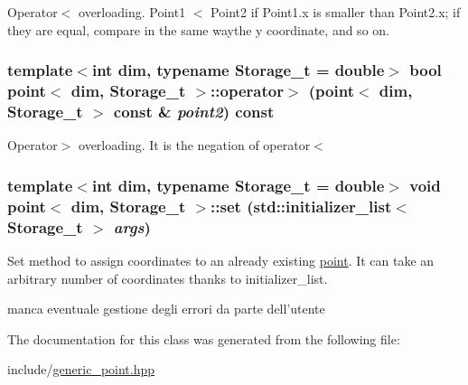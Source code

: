 Operator$<$ overloading. Point1 $<$ Point2 if Point1.x is smaller than Point2.x; if they are equal, compare in the same waythe y coordinate, and so on. \hypertarget{classpoint_a8baf3445a84302a9f290ff6c71648ced}{
\subsubsection[{operator$>$}]{\setlength{\rightskip}{0pt plus 5cm}template$<$int dim, typename Storage\_\-t = double$>$ bool {\bf point}$<$ dim, Storage\_\-t $>$::operator$>$ ({\bf point}$<$ dim, Storage\_\-t $>$ const \& {\em point2}) const}}
\label{classpoint_a8baf3445a84302a9f290ff6c71648ced}


Operator$>$ overloading. It is the negation of operator$<$ \hypertarget{classpoint_adf5774c5279be365241693d6da0aaf8c}{
\subsubsection[{set}]{\setlength{\rightskip}{0pt plus 5cm}template$<$int dim, typename Storage\_\-t = double$>$ void {\bf point}$<$ dim, Storage\_\-t $>$::set (std::initializer\_\-list$<$ Storage\_\-t $>$ {\em args})}}
\label{classpoint_adf5774c5279be365241693d6da0aaf8c}


Set method to assign coordinates to an already existing \hyperlink{classpoint}{point}. It can take an arbitrary number of coordinates thanks to initializer\_\-list. 

manca eventuale gestione degli errori da parte dell'utente 

The documentation for this class was generated from the following file:\begin{DoxyCompactItemize}
\item 
include/\hyperlink{generic__point_8hpp}{generic\_\-point.hpp}\end{DoxyCompactItemize}
